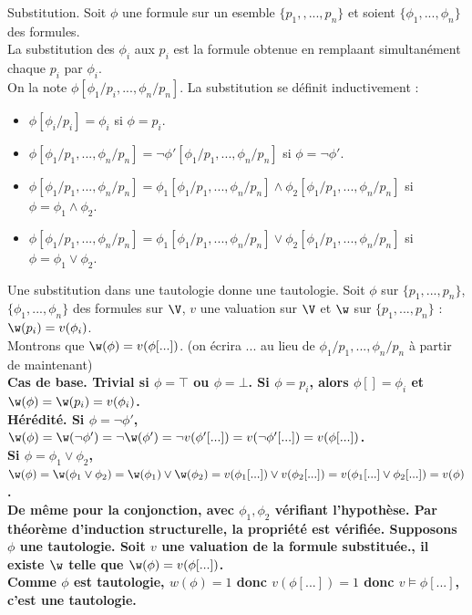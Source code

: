 \documentclass[french, 11pt]{article}
\begin{document}
\begin{defi}{Substitution.}{}
    Soit $\phi$ une formule sur un esemble $\{p_1,,...,p_n\}$ et soient $\{\phi_1,...,\phi_n\}$ des formules.\\
    La substitution des $\phi_i$ aux $p_i$ est la formule obtenue en remplaant simultanément chaque $p_i$ par $\phi_i$.\\
    On la note $\phi[\phi_1/p_i,...,\phi_n/p_n]$.\n
    La substitution se définit inductivement :
    \begin{itemize}
        \item $\phi[\phi_i/p_i]=\phi_i$ si $\phi=p_i$.
        \item $\phi[\phi_1/p_1,...,\phi_n/p_n]=\lnot\phi'[\phi_1/p_1,...,\phi_n/p_n]$ si $\phi=\lnot\phi'$.
        \item $\phi[\phi_1/p_1,...,\phi_n/p_n]=\phi_1[\phi_1/p_1,...,\phi_n/p_n]\land\phi_2[\phi_1/p_1,...,\phi_n/p_n]$ si $\phi=\phi_1\land\phi_2$.
        \item $\phi[\phi_1/p_1,...,\phi_n/p_n]=\phi_1[\phi_1/p_1,...,\phi_n/p_n]\lor\phi_2[\phi_1/p_1,...,\phi_n/p_n]$ si $\phi=\phi_1\lor\phi_2$.
    \end{itemize}
\end{defi}

\vspace*{-0.7cm}

\begin{prop}{}{}
    Une substitution dans une tautologie donne une tautologie.
    \tcblower
    Soit $\phi$ sur $\{p_1,...,p_n\}$, $\{\phi_1,...,\phi_n\}$ des formules sur $\V$, $v$ une valuation sur $\V$ et $\w$ sur $\{p_1,...,p_n\}$ : $\w(p_i)=v(\phi_i)$.\\
    Montrons que $\w(\phi)=v(\phi[...])$. (on écrira ... au lieu de $\phi_1/p_1,...,\phi_n/p_n$ à partir de maintenant)\\
    \bf{Cas de base.} Trivial si $\phi=\top$ ou $\phi=\bot$. Si $\phi=p_i$, alors $\phi[]=\phi_i$ et $\w(\phi)=\w(p_i)=v(\phi_i)$.\\
    \bf{Hérédité.} Si $\phi=\lnot\phi'$, $\w(\phi)=\w(\lnot\phi')=\lnot\w(\phi')=\lnot v(\phi'[...])=v(\lnot\phi'[...])=v(\phi[...])$.\\
    Si $\phi=\phi_1\lor\phi_2$, $\w(\phi)=\w(\phi_1\lor\phi_2)=\w(\phi_1)\lor\w(\phi_2)=v(\phi_1[...])\lor v(\phi_2[...])=v(\phi_1[...]\lor\phi_2[...])=v(\phi)$.\\
    De même pour la conjonction, avec $\phi_1, \phi_2$ vérifiant l'hypothèse. Par théorème d'induction structurelle, la propriété est vérifiée.\n
    Supposons $\phi$ une tautologie. Soit $v$ une valuation de la formule substituée., il existe $\w$ telle que $\w(\phi)=v(\phi[...])$.\\
    Comme $\phi$ est tautologie, $w(\phi)=1$ donc $v(\phi[...])=1$ donc $v\models\phi[...]$, c'est une tautologie.
\end{prop}
\end{document}
